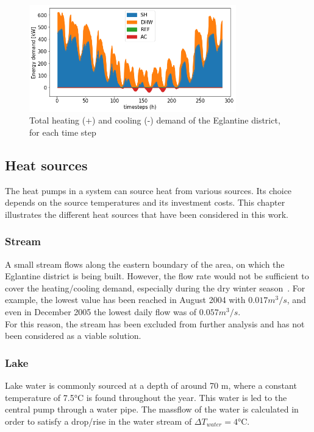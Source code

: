 \documentclass{article}
\begin{document}
\begin{figure}[h!]
	\centering
	\includegraphics[width=0.8\textwidth]{energy_demand.png}
	\caption{Total heating (+) and cooling (-) demand of the Eglantine district, for each time step}
	\label{fig:energyDemand}
\end{figure}


\subsection{Heat sources}
The heat pumps in a system can source heat from various sources. Its choice depends on the source temperatures and its investment costs. This chapter illustrates the different heat sources that have been considered in this work.

\subsubsection{Stream}
A small stream flows along the eastern boundary of the area, on which the Eglantine district is being built. However, the flow rate would not be sufficient to cover the heating/cooling demand, especially during the dry winter season~\cite{veillehydro-meteorologiqueducantondevaudMorgesRiviere}. For example, the lowest value has been reached in August 2004 with $0.017 m^3/s$, and even in December 2005 the lowest daily flow was of $0.057 m^3/s$. \\
For this reason, the stream has been excluded from further analysis and has not been considered as a viable solution.

\subsubsection{Lake}
Lake water is commonly sourced at a depth of around 70 m, where a constant temperature of 7.5\si{\celsius} is found throughout the year. This water is led to the central pump through a water pipe. The massflow of the water is calculated in order to satisfy a drop/rise in the water stream of $\Delta T_{water}  = 4 \si{\celsius}$.
\end{document}
